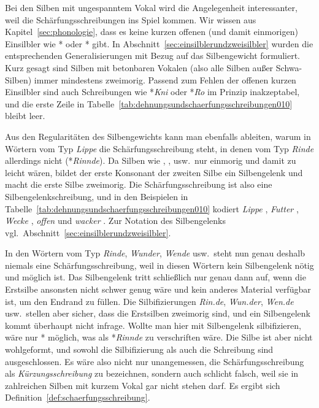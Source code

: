 Bei den Silben mit ungespanntem Vokal wird die Angelegenheit interessanter, weil die Schärfungsschreibungen ins Spiel kommen.
Wir wissen aus Kapitel~\ref{sec:phonologie}, dass es keine kurzen offenen (und damit einmorigen) Einsilbler wie *\textipa{[knI]} oder *\textipa{[KO]} gibt.
In Abschnitt~\ref{sec:einsilblerundzweisilbler} wurden die entsprechenden Generalisierungen mit Bezug auf das Silbengewicht formuliert.
Kurz gesagt sind Silben mit betonbaren Vokalen (also alle Silben außer Schwa-Silben) immer mindestens zweimorig.
Passend zum Fehlen der offenen kurzen Einsilbler sind auch Schreibungen wie *\textit{Kni} oder *\textit{Ro} im Prinzip inakzeptabel, und die erste Zeile in Tabelle~\ref{tab:dehnungsundschaerfungsschreibungen010} bleibt leer.

Aus den Regularitäten des Silbengewichts kann man ebenfalls ableiten, warum in Wörtern vom Typ \textit{Lippe} die Schärfungsschreibung steht, in denen vom Typ \textit{Rinde} allerdings nicht (*\textit{Rinnde}).
Da Silben wie \textipa{[lI]}, \textipa{[fU]}, \textipa{[vE]} usw.\ nur einmorig und damit zu leicht wären, bildet der erste Konsonant der zweiten Silbe ein Silbengelenk und macht die erste Silbe zweimorig.
Die Schärfungsschreibung ist also eine Silbengelenkschreibung, und in den Beispielen in Tabelle~\ref{tab:dehnungsundschaerfungsschreibungen010} kodiert \textit{Lippe} \textipa{[lI\Sgel{p}@]}, \textit{Futter} \textipa{[fU\Sgel{t}5]}, \textit{Wecke} \textipa{[vE\Sgel{k}@]}, \textit{offen} \textipa{[O\Sgel{f}@n]} und \textit{wacker} \textipa{[va\Sgel{k}5]}.
Zur Notation des Silbengelenks vgl.\ Abschnitt~\ref{sec:einsilblerundzweisilbler}.

In den Wörtern vom Typ \textit{Rinde}, \textit{Wunder}, \textit{Wende} usw.\ steht nun genau deshalb niemals eine Schärfungsschreibung, weil in diesen Wörtern kein Silbengelenk nötig und möglich ist.
Das Silbengelenk tritt schließlich nur genau dann auf, wenn die Erstsilbe ansonsten nicht schwer genug wäre und kein anderes Material verfügbar ist, um den Endrand zu füllen.
Die Silbifizierungen \textit{Rin.de}, \textit{Wun.der}, \textit{Wen.de} usw.\ stellen aber sicher, dass die Erstsilben zweimorig sind, und ein Silbengelenk kommt überhaupt nicht infrage.
Wollte man hier mit Silbengelenk silbifizieren, wäre nur *\textipa{[KI\Sgel{n}d@]} möglich, was als *\textit{Rinnde} zu verschriften wäre.
Die Silbe \textipa{[nd@]} ist aber nicht wohlgeformt, und sowohl die Silbifizierung als auch die Schreibung sind ausgeschlossen.
Es wäre also nicht nur unangemessen, die Schärfungsschreibung als \textit{Kürzungsschreibung} zu bezeichnen, sondern auch schlicht falsch, weil sie in zahlreichen Silben mit kurzem Vokal gar nicht stehen darf.
Es ergibt sich Definition~\ref{def:schaerfungsschreibung}.

